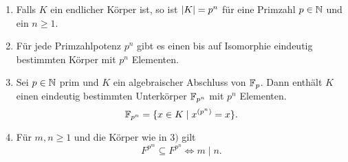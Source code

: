 \begin{theorem}
	\begin{enumerate}
		\item Falls $K$ ein endlicher Körper ist, so ist $\abs{K} = p^{n}$ für eine Primzahl $p \in \mathbb{N}$ und ein $n \geq 1$.
		\item Für jede Primzahlpotenz $p^{n}$ gibt es einen bis auf Isomorphie eindeutig bestimmten Körper mit $p^{n}$ Elementen.
		\item Sei $p \in \mathbb{N}$ prim und $K$ ein algebraischer Abschluss von $\mathbb{F}_{p}$. Dann enthält $K$ einen eindeutig bestimmten
			Unterkörper $\mathbb{F}_{p^{n}}$ mit $p^{n}$ Elementen.
			\[
			\mathbb{F}_{p^{n}} = \{x \in K \mid x^{\left( p^{n} \right)} = x\} 
			.\] 
		\item Für $m,n \geq 1$ und die Körper wie in $3)$ gilt
			\[
			F^{p^{m}} \subseteq F^{p^{n}} \Leftrightarrow m \mid n
			.\] 
	\end{enumerate}
\end{theorem}

